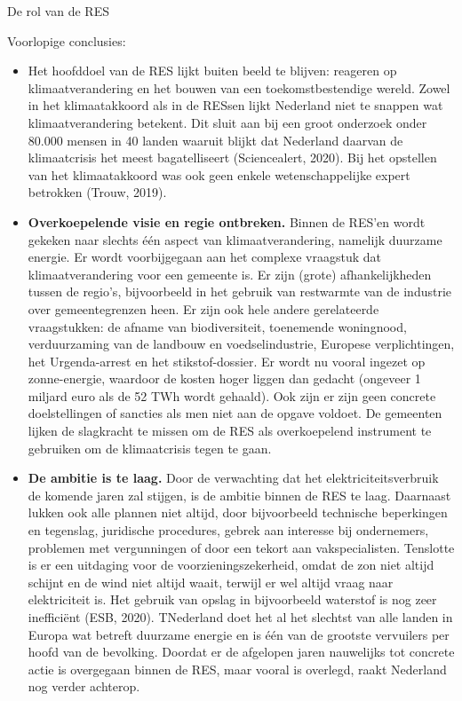 \begin{voorstel}{De rol van de RES}
\begin{multicols*}{2}
\begin{overwegingen}
Voorlopige conclusies:
\begin{itemize}
	\item Het hoofddoel van de RES lijkt buiten beeld te blijven: reageren op klimaatverandering en het bouwen van een toekomstbestendige wereld. Zowel in het klimaatakkoord als in de RESsen lijkt Nederland niet te snappen wat klimaatverandering betekent. Dit sluit aan bij een groot onderzoek onder 80.000 mensen in 40 landen waaruit blijkt dat Nederland daarvan de klimaatcrisis het meest bagatelliseert (Sciencealert, 2020). Bij het opstellen van het klimaatakkoord was ook geen enkele wetenschappelijke expert betrokken (Trouw, 2019).
	\item \textbf{Overkoepelende visie en regie ontbreken.} Binnen de RES’en wordt gekeken naar slechts één aspect van klimaatverandering, namelijk duurzame energie. Er wordt voorbijgegaan aan het complexe vraagstuk dat klimaatverandering voor een gemeente is. Er zijn (grote) afhankelijkheden tussen de regio’s, bijvoorbeeld in het gebruik van restwarmte van de industrie over gemeentegrenzen heen. Er zijn ook hele andere gerelateerde vraagstukken: de afname van biodiversiteit, toenemende woningnood, verduurzaming van de landbouw en voedselindustrie, Europese verplichtingen, het Urgenda-arrest en het stikstof-dossier. Er wordt nu vooral ingezet op zonne-energie, waardoor de kosten hoger liggen dan gedacht (ongeveer 1 miljard euro als de 52 TWh wordt gehaald). Ook zijn er zijn geen concrete doelstellingen of sancties als men niet aan de opgave voldoet. De gemeenten lijken de slagkracht te missen om de RES als overkoepelend instrument te gebruiken om de klimaatcrisis tegen te gaan.
	\item \textbf{De ambitie is te laag.} Door de verwachting dat het elektriciteitsverbruik de komende jaren zal stijgen, is de ambitie binnen de RES te laag. Daarnaast lukken ook alle plannen niet altijd, door bijvoorbeeld technische beperkingen en tegenslag, juridische procedures, gebrek aan interesse bij ondernemers, problemen met vergunningen of door een tekort aan vakspecialisten. Tenslotte is er een uitdaging voor de voorzieningszekerheid, omdat de zon niet altijd schijnt en de wind niet altijd waait, terwijl er wel altijd vraag naar elektriciteit is. Het gebruik van opslag in bijvoorbeeld waterstof is nog zeer inefficiënt (ESB, 2020). TNederland doet het al het slechtst van alle landen in Europa wat betreft duurzame energie en is één van de grootste vervuilers per hoofd van de bevolking. Doordat er de afgelopen jaren nauwelijks tot concrete actie is overgegaan binnen de RES, maar vooral is overlegd, raakt Nederland nog verder achterop.

\end{itemize}
\end{overwegingen}
\end{multicols*}
\end{voorstel}
